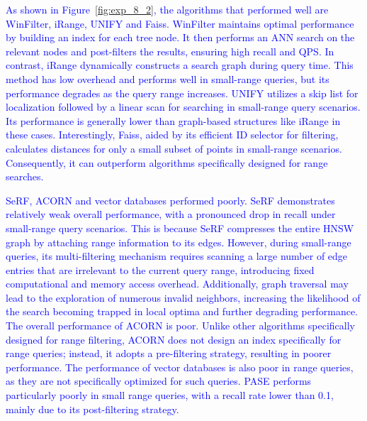 \documentclass[sigconf, nonacm]{acmart}
\begin{document}
{	%
	
	\textcolor{blue}{
		As shown in Figure~\ref{fig:exp_8_2}, the algorithms that performed well are WinFilter, iRange, UNIFY and Faiss.
	WinFilter maintains optimal performance by building an index for each tree node. It then performs an ANN search on the relevant nodes and post-filters the results, ensuring high recall and QPS.
	In contrast, iRange dynamically constructs a search graph during query time. This method has low overhead and performs well in small-range queries, but its performance degrades as the query range increases.
	UNIFY utilizes a skip list for localization followed by a linear scan for searching in small-range query scenarios. Its performance is generally lower than graph-based structures like iRange in these cases.
	Interestingly, Faiss, aided by its efficient ID selector for filtering, calculates distances for only a small subset of points in small-range scenarios. Consequently, it can outperform algorithms specifically designed for range searches.
	}

	\textcolor{blue}{SeRF, ACORN and vector databases performed poorly.
		SeRF demonstrates relatively weak overall performance, with a pronounced drop in recall under small-range query scenarios. This is because SeRF compresses the entire HNSW graph by attaching range information to its edges. However, during small-range queries, its multi-filtering mechanism requires scanning a large number of edge entries that are irrelevant to the current query range, introducing fixed computational and memory access overhead. Additionally, graph traversal may lead to the exploration of numerous invalid neighbors, increasing the likelihood of the search becoming trapped in local optima and further degrading performance.
		The overall performance of ACORN is poor. Unlike other algorithms specifically designed for range filtering, ACORN does not design an index specifically for range queries; instead, it adopts a pre-filtering strategy, resulting in poorer performance.
		The performance of vector databases is also poor in range queries, as they are not specifically optimized for such queries. PASE performs particularly poorly in small range queries, with a recall rate lower than 0.1, mainly due to its post-filtering strategy.
	}

	
	
}
\end{document}
